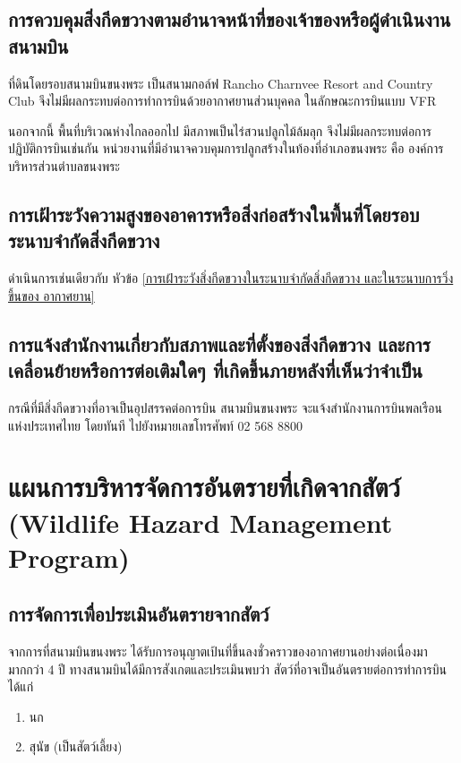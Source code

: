 \subsection{การควบคุมสิ่งกีดขวางตามอำนาจหน้าที่ของเจ้าของหรือผู้ดำเนินงานสนามบิน}

ที่ดินโดยรอบสนามบินขนงพระ เป็นสนามกอล์ฟ Rancho Charnvee Resort and Country Club จึงไม่มีผลกระทบต่อการทำการบินด้วยอากาศยานส่วนบุคคล ในลักษณะการบินแบบ VFR   

นอกจากนี้ พื้นที่บริเวณห่างไกลออกไป มีสภาพเป็นไร่สวนปลูกไม้ล้มลุก จึงไม่มีผลกระทบต่อการปฏิบัติการบินเช่นกัน
หน่วยงานที่มีอำนาจควบคุมการปลูกสร้างในท้องที่อำเภอขนงพระ คือ องค์การบริหารส่วนตำบลขนงพระ 

\subsection{การเฝ้าระวังความสูงของอาคารหรือสิ่งก่อสร้างในพื้นที่โดยรอบระนาบจำกัดสิ่งกีดขวาง}

ดำเนินการเช่นเดียวกับ หัวข้อ \ref{การเฝ้าระวังสิ่งกีดขวางในระนาบจำกัดสิ่งกีดขวาง และในระนาบการวิ่งขึ้นของ
อากาศยาน}

\subsection{การแจ้งสำนักงานเกี่ยวกับสภาพและที่ตั้งของสิ่งกีดขวาง และการเคลื่อนย้ายหรือการต่อเติมใดๆ ที่เกิดขึ้นภายหลังที่เห็นว่าจำเป็น}

กรณีที่มีสิ่งกีดขวางที่อาจเป็นอุปสรรคต่อการบิน สนามบินขนงพระ จะแจ้งสำนักงานการบินพลเรือนแห่งประเทศไทย โดยทันที ไปยังหมายเลขโทรศัพท์ 02 568 8800 

\section{แผนการบริหารจัดการอันตรายที่เกิดจากสัตว์ (Wildlife Hazard Management Program)}

\subsection{การจัดการเพื่อประเมินอันตรายจากสัตว์}

จากการที่สนามบินขนงพระ ได้รับการอนุญาตเป้นที่ขึ้นลงชั่วคราวของอากาศยานอย่างต่อเนื่องมามากกว่า 4 ปี ทางสนามบินได้มีการสังเกตและประเมินพบว่า สัตว์ที่อาจเป็นอันตรายต่อการทำการบินได้แก่

\begin{enumerate}
\item นก
\item สุนัข (เป็นสัตว์เลี้ยง)
\end{enumerate}

